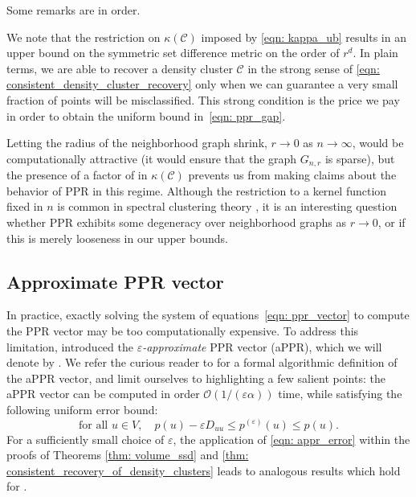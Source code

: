 \documentclass[11pt,twoside]{article}
\newcommand{\1}{\mathbbm{1}}
\newcommand{\pbf}{p}        %
\newcommand{\Xbf}{X}
\newcommand{\Dbf}{D}
\newcommand{\Cset}{\mathcal{C}}
\newcommand{\Csig}{\Cset_{\sigma}}
\newcommand{\Cest}{\widehat{C}}
\begin{document}
Some remarks are in order.

\begin{remark}
We note that the restriction on $\kappa(\Cset)$ imposed by \eqref{eqn: kappa_ub} results in an upper bound on the symmetric set difference metric
  \smash{$\Delta(\Cest, \Csig[\Xbf])$} on the order of $r^d$. In plain terms, we 
  are able to recover a  density cluster $\Cset$ in the strong sense of
  \eqref{eqn: consistent_density_cluster_recovery} only when we can guarantee a
  very small fraction of points will be misclassified. This strong condition is
  the price we pay in order to obtain the uniform bound in~\eqref{eqn: ppr_gap}.  
\end{remark}

\begin{remark}
  Letting the radius of the neighborhood graph shrink, $r \to 0$ as $n \to  
  \infty$, would be computationally attractive (it would ensure that the graph 
  $G_{n,r}$ is sparse), but the presence of a factor of 
  in $\kappa(\Cset)$ prevents us from making claims about the behavior of PPR in
  this regime. Although the restriction to a kernel function fixed in $n$ is
  common in spectral clustering theory \citep{schiebinger2015,vonluxburg2008},
  it is an interesting question whether PPR exhibits some degeneracy over 
  neighborhood graphs as $r \to 0$, or if this is merely looseness in our  
  upper bounds.
\end{remark}

\subsection{Approximate PPR vector} 

In practice, exactly solving the system of equations~\eqref{eqn:
  ppr_vector} to compute the PPR vector 
  may be too computationally expensive. To address this limitation,
\citet{andersen2006} introduced the \emph{$\varepsilon$-approximate} PPR vector
(aPPR), which we will denote by \smash{$\pbf^{(\varepsilon)}$}. We refer the
curious reader to \citet{andersen2006} for a formal algorithmic definition of
the aPPR vector, and limit ourselves to highlighting a few salient points: the
aPPR vector can be computed in order $\mathcal{O}(1/(\varepsilon\alpha))$ time,
while satisfying the following uniform error bound: 
\begin{equation}
\label{eqn: appr_error}
\textrm{for all $u \in V$}, \quad \pbf(u) - \varepsilon \Dbf_{uu}\leq
\pbf^{(\varepsilon)}(u) \leq \pbf(u).  
\end{equation}
For a sufficiently small choice of $\varepsilon$, the 
application of \eqref{eqn: appr_error} within the proofs of Theorems
\ref{thm: volume_ssd} and \ref{thm: consistent_recovery_of_density_clusters}  
leads to analogous results which hold for \smash{$\pbf^{(\varepsilon)}$}.
\end{document}
